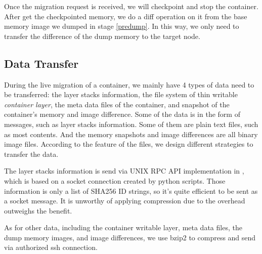Once the migration request is received, we will checkpoint and stop the container. After get the checkpointed memory, we do a diff operation on it from the base memory image we dumped in stage \ref{predump}. 
In this way, we only need to transfer the difference of the dump memory to the target node. 

\subsection{Data Transfer}\label{design:compression}

During the live migration of a container, we mainly have 4 types of data need to be transferred:
the layer stacks information, the file system of thin writable \textit{container layer}, the meta data files of the container, and snapshot of the container's memory and image difference. Some of the data is in the form of messages, such as layer stacks information. Some of them are plain text files, such as most contents. And the memory snapshots and image differences are all binary image files. According to the feature of the files, we design different strategies to transfer the data.

The layer stacks information is send via UNIX RPC API implementation in \cite{phaul}, which is based on a socket connection created by python scripts. Those information is only a list of SHA256 ID strings, so it's quite efficient to be sent as a socket message. It is unworthy of applying compression due to the overhead outweighs the benefit.

As for other data, including the container writable layer, meta data files, the dump memory images, and image differences, we use bzip2 to compress and send via authorized ssh connection.




